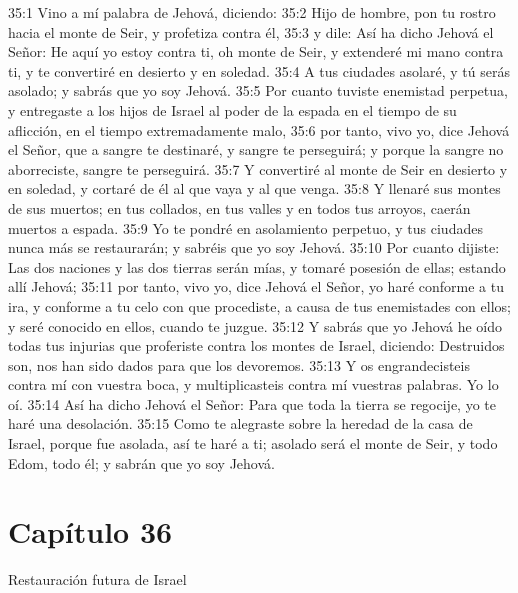 35:1 Vino a mí palabra de Jehová, diciendo:   
35:2 Hijo de hombre, pon tu rostro hacia el monte de Seir,  y profetiza contra él,   
35:3 y dile: Así ha dicho Jehová el Señor: He aquí yo estoy contra ti, oh monte de Seir, y extenderé mi mano contra ti, y te convertiré en desierto y en soledad.   
35:4 A tus ciudades asolaré, y tú serás asolado; y sabrás que yo soy Jehová.   
35:5 Por cuanto tuviste enemistad perpetua, y entregaste a los hijos de Israel al poder de la espada en el tiempo de su aflicción, en el tiempo extremadamente malo,   
35:6 por tanto, vivo yo, dice Jehová el Señor, que a sangre te destinaré, y sangre te perseguirá; y porque la sangre no aborreciste, sangre te perseguirá.   
35:7 Y convertiré al monte de Seir en desierto y en soledad, y cortaré de él al que vaya y al que venga.   
35:8 Y llenaré sus montes de sus muertos; en tus collados, en tus valles y en todos tus arroyos, caerán muertos a espada.   
35:9 Yo te pondré en asolamiento perpetuo, y tus ciudades nunca más se restaurarán; y sabréis que yo soy Jehová.   
35:10 Por cuanto dijiste: Las dos naciones y las dos tierras serán mías, y tomaré posesión de ellas; estando allí Jehová;   
35:11 por tanto, vivo yo, dice Jehová el Señor, yo haré conforme a tu ira, y conforme a tu celo con que procediste, a causa de tus enemistades con ellos; y seré conocido en ellos, cuando te juzgue.   
35:12 Y sabrás que yo Jehová he oído todas tus injurias que proferiste contra los montes de Israel, diciendo: Destruidos son, nos han sido dados para que los devoremos.   
35:13 Y os engrandecisteis contra mí con vuestra boca, y multiplicasteis contra mí vuestras palabras. Yo lo oí.   
35:14 Así ha dicho Jehová el Señor: Para que toda la tierra se regocije, yo te haré una desolación.   
35:15 Como te alegraste sobre la heredad de la casa de Israel, porque fue asolada, así te haré a ti; asolado será el monte de Seir, y todo Edom, todo él; y sabrán que yo soy Jehová. 
\section*{Capítulo 36}  
Restauración futura de Israel   
  
